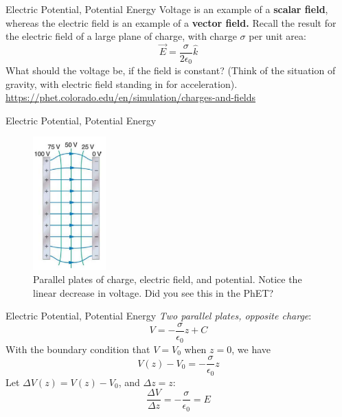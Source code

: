 \documentclass{beamer}
\begin{document}
\begin{frame}{Electric Potential, Potential Energy}
Voltage is an example of a \textbf{scalar field}, whereas the electric field is an example of a \textbf{vector field.}  Recall the result for the electric field of a large plane of charge, with charge $\sigma$ per unit area:
\begin{equation}
\vec{E} = \frac{\sigma}{2\epsilon_0} \hat{k}
\end{equation}
What should the voltage be, if the field is constant?  (Think of the situation of gravity, with electric field standing in for acceleration). \\ \vspace{0.5cm}
\url{https://phet.colorado.edu/en/simulation/charges-and-fields}
\end{frame}

\begin{frame}{Electric Potential, Potential Energy}
\begin{figure}
\centering
\includegraphics[width=0.25\textwidth]{figures/plates.png}
\caption{\label{fig:plates} Parallel plates of charge, electric field, and potential.  Notice the linear decrease in voltage.  Did you see this in the PhET?}
\end{figure}
\end{frame}

\begin{frame}{Electric Potential, Potential Energy}
\textit{Two parallel plates, opposite charge}:
\begin{equation}
V = -\frac{\sigma}{\epsilon_0}z + C
\end{equation}
With the boundary condition that $V = V_0$ when $z = 0$, we have
\begin{equation}
V(z) - V_0 = -\frac{\sigma}{\epsilon_0}z
\end{equation}
Let $\Delta V(z) = V(z) - V_0$, and $\Delta z = z$:
\begin{equation}
\frac{\Delta V}{\Delta z} = -\frac{\sigma}{\epsilon_0} =  E
\end{equation}
\end{frame}
\end{document}

